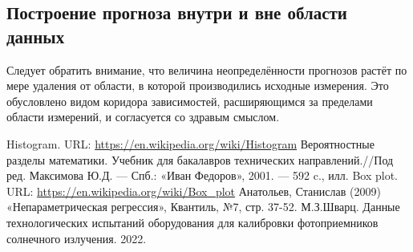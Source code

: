 \documentclass[a4paper,14pt]{article}
\begin{document}
	\subsection{Построение прогноза внутри и вне области данных}
	Следует обратить внимание, что величина неопределённости прогнозов растёт по мере удаления от области, в которой производились исходные измерения. Это обусловлено видом коридора зависимостей, расширяющимся за пределами области измерений, и согласуется со здравым смыслом.
	
	\newpage
	
	\begin{thebibliography}{4}
		Histogram. URL: \url{https://en.wikipedia.org/wiki/Histogram}
		Вероятностные разделы математики. Учебник для бакалавров технических направлений.//Под ред. Максимова Ю.Д. --- Спб.: «Иван Федоров», 2001. --- 592 c., илл.
		Box plot. URL: \url{https://en.wikipedia.org/wiki/Box_plot}
		Анатольев, Станислав (2009) «Непараметрическая регрессия», Квантиль, №7, стр. 37-52.
		 М.З.Шварц. Данные технологических испытаний оборудования для калибровки фотоприемников солнечного излучения. 2022.
	\end{thebibliography}
\end{document}
